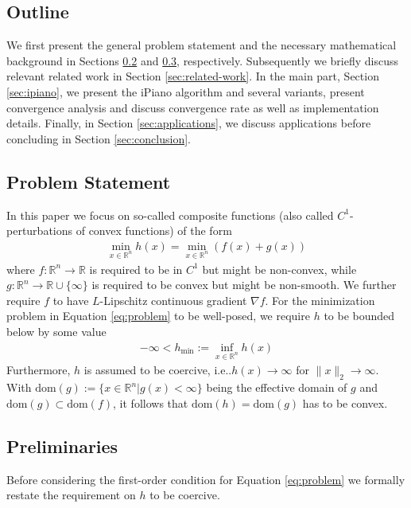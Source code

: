 \documentclass[onecolumn,final,a4paper,13pt,reqno]{siamart}
\makeatletter
\DeclareRobustCommand\onedot{\futurelet\@let@token\@onedot}
\def\@onedot{\ifx\@let@token.\else.\null\fi\xspace}
\def\ie{{i.e}\onedot} \def\Ie{{I.e}\onedot}
\def\dom{\text{dom}}
\makeatother
\begin{document}
\subsection{Outline} We first present the general problem statement and the necessary mathematical background in Sections \ref{subsec:problem} and \ref{subsec:preliminaries}, respectively. Subsequently we briefly discuss relevant related work in Section \ref{sec:related-work}. In the main part, Section \ref{sec:ipiano}, we present the iPiano algorithm and several variants, present convergence analysis and discuss convergence rate as well as implementation details. Finally, in Section \ref{sec:applications}, we discuss applications before concluding in Section \ref{sec:conclusion}.

\subsection{Problem Statement}
\label{subsec:problem}

In this paper we focus on so-called composite functions (also called $C^1$-perturbations of convex functions) of the form
\begin{align}
	\min_{x \in \mathbb{R}^n} h(x) = \min_{x \in \mathbb{R}^n} (f(x) + g(x))\label{eq:problem}
\end{align}
where $f : \mathbb{R}^n \rightarrow \mathbb{R}$ is required to be in $C^1$ but might be non-convex, while $g : \mathbb{R}^n \rightarrow \mathbb{R} \cup \{\infty\}$ is required to be convex but might be non-smooth. We further require $f$ to have $L$-Lipschitz continuous gradient $\nabla f$. For the minimization problem in Equation \eqref{eq:problem} to be well-posed, we require $h$ to be bounded below by some value
\begin{align}
	-\infty < h_{\min} := \inf _{x \in \mathbb{R}^n} h(x)
\end{align}
Furthermore, $h$ is assumed to be coercive, \ie $h(x) \rightarrow \infty$ for $\|x\|_2 \rightarrow \infty$. With $\dom(g) := \{x \in \mathbb{R}^n | g(x) < \infty\}$ being the effective domain of $g$ and $\dom(g) \subset \dom(f)$, it follows that $\dom(h) = \dom(g)$ has to be convex.

\subsection{Preliminaries}
\label{subsec:preliminaries}

Before considering the first-order condition for Equation \eqref{eq:problem} we formally restate the requirement on $h$ to be coercive.
\end{document}
